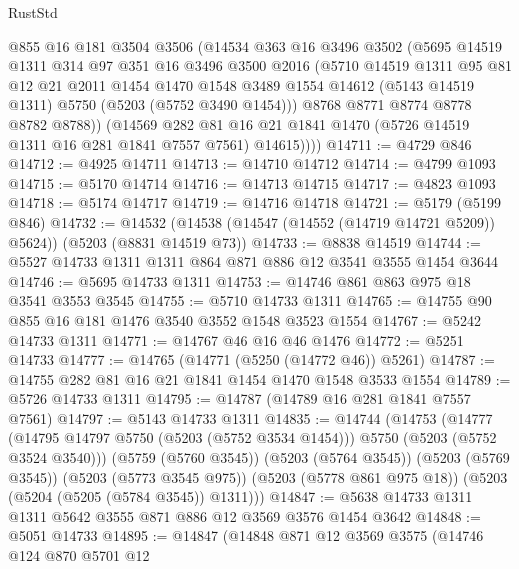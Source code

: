\begin{lexlean}{RustStd}
\begin{coremodule}
          @855
          @16
          @181
          @3504
          @3506
          (@14534
            @363
            @16
            @3496
            @3502
            (@5695
              @14519
              @1311
              @314
              @97
              @351
              @16
              @3496
              @3500
              @2016
              (@5710
                @14519
                @1311
                @95
                @81
                @12
                @21
                @2011
                @1454
                @1470
                @1548
                @3489
                @1554
                @14612
                (@5143 @14519 @1311)
                @5750
                (@5203 (@5752 @3490 @1454)))
              @8768
              @8771
              @8774
              @8778
              @8782
              @8788))
          (@14569
            @282
            @81
            @16
            @21
            @1841
            @1470
            (@5726 @14519 @1311 @16 @281 @1841 @7557 @7561)
            @14615))))
@14711 := @4729 @846
@14712 := @4925 @14711
@14713 := @14710 @14712
@14714 := @4799 @1093
@14715 := @5170 @14714
@14716 := @14713 @14715
@14717 := @4823 @1093
@14718 := @5174 @14717
@14719 := @14716 @14718
@14721 := @5179 (@5199 @846)
@14732 := @14532 (@14538 (@14547 (@14552 (@14719 @14721 @5209)) @5624)) (@5203 (@8831 @14519 @73))
@14733 := @8838 @14519
@14744 := @5527 @14733 @1311 @1311 @864 @871 @886 @12 @3541 @3555 @1454 @3644
@14746 := @5695 @14733 @1311
@14753 := @14746 @861 @863 @975 @18 @3541 @3553 @3545
@14755 := @5710 @14733 @1311
@14765 := @14755 @90 @855 @16 @181 @1476 @3540 @3552 @1548 @3523 @1554
@14767 := @5242 @14733 @1311
@14771 := @14767 @46 @16 @46 @1476
@14772 := @5251 @14733
@14777 := @14765 (@14771 (@5250 (@14772 @46)) @5261)
@14787 := @14755 @282 @81 @16 @21 @1841 @1454 @1470 @1548 @3533 @1554
@14789 := @5726 @14733 @1311
@14795 := @14787 (@14789 @16 @281 @1841 @7557 @7561)
@14797 := @5143 @14733 @1311
@14835 := @14744
    (@14753
      (@14777 (@14795 @14797 @5750 (@5203 (@5752 @3534 @1454))) @5750 (@5203 (@5752 @3524 @3540)))
      (@5759 (@5760 @3545))
      (@5203 (@5764 @3545))
      (@5203 (@5769 @3545))
      (@5203 (@5773 @3545 @975))
      (@5203 (@5778 @861 @975 @18))
      (@5203 (@5204 (@5205 (@5784 @3545)) @1311)))
@14847 := @5638 @14733 @1311 @1311 @5642 @3555 @871 @886 @12 @3569 @3576 @1454 @3642
@14848 := @5051 @14733
@14895 := @14847
    (@14848
      @871
      @12
      @3569
      @3575
      (@14746
        @124
        @870
        @5701
        @12

\end{coremodule}
\end{lexlean}
